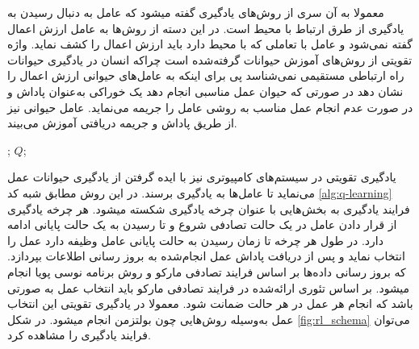 معمولا به آن سری از روش‌های یادگیری گفته میشود که عامل به دنبال رسیدن به یادگیری از طرق ارتباط با محیط است. در این دسته از روش‌ها به عامل ارزش اعمال گفته نمی‌شود و عامل با تعاملی که با محیط دارد باید ارزش اعمال را کشف نماید.
واژه تقویتی از روش‌های آموزش حیوانات گرفته‌شده است چراکه انسان در یادگیری حیوانات راه ارتباطی مستقیمی نمی‌شناسد پی برای اینکه به عامل‌های حیوانی ارزش اعمال را نشان دهد در صورتی که حیوان عمل مناسبی انجام دهد یک خوراکی به‌عنوان پاداش و در صورت عدم انجام عمل مناسب به روشی عامل را جریمه می‌نماید. عامل حیوانی نیز از طریق پاداش و جریمه دریافتی آموزش می‌بیند.

\begin{algorithm}[t]
\caption{}\label{alg:q-learning}
\begin{latin}
\begin{algorithmic}[1]
;
\EndWhile
\State \Return $Q$;
\EndProcedure
\end{algorithmic}
\end{latin}
\end{algorithm}

یادگیری تقویتی در سیستم‌های کامپیوتری نیز با ایده گرفتن از یادگیری حیوانات عمل می‌نماید تا عامل‌ها به یادگیری برسند. در این روش مطابق شبه کد \ref{alg:q-learning} فرایند یادگیری به بخش‌هایی با عنوان چرخه یادگیری شکسته میشود. هر چرخه یادگیری از قرار دادن عامل در یک حالت تصادفی شروع و تا رسیدن به یک حالت پایانی ادامه دارد. در طول هر چرخه تا زمان رسیدن به حالت پایانی عامل وظیفه دارد عمل را انتخاب نماید و پس از دریافت پاداش عمل انجام‌شده به بروز رسانی اطلاعات  بپردازد. که بروز رسانی داده‌ها بر اساس فرایند تصادفی مارکو و روش برنامه نوسی پویا انجام میشود. بر اساس تئوری ارائه‌شده در فرایند تصادفی مارکو باید انتخاب عمل به صورتی باشد که انجام هر عمل در هر حالت ضمانت شود. معمولا در یادگیری تقویتی این انتخاب عمل به‌وسیله روش‌هایی چون بولتزمن انجام میشود. در شکل \ref{fig:rl_schema} می‌توان فرایند یادگیری را مشاهده کرد.


